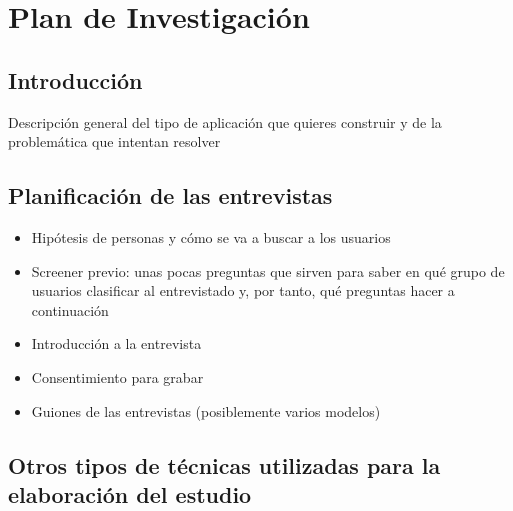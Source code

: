 \chapter{Plan de Investigación}

\section{Introducción}
Descripción general del tipo de aplicación que quieres construir y de la problemática que intentan resolver


\section{Planificación de las entrevistas}

\begin{itemize}
    \item Hipótesis de personas y cómo se va a buscar a los usuarios
    \item Screener previo: unas pocas preguntas que sirven para saber en qué grupo de usuarios clasificar al entrevistado y, por tanto, qué preguntas hacer a continuación
    \item Introducción a la entrevista
    \item Consentimiento para grabar
    \item Guiones de las entrevistas (posiblemente varios modelos)
\end{itemize}

\section{Otros tipos de técnicas utilizadas para la elaboración del estudio}